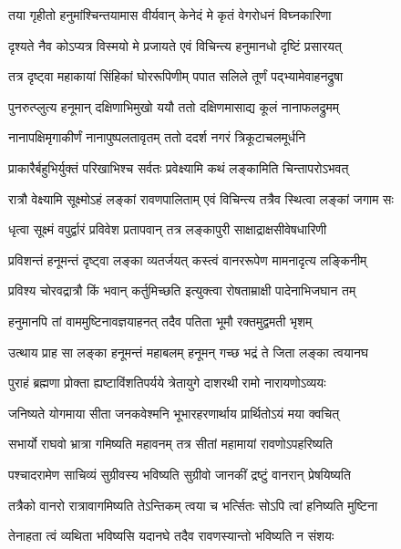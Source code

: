 \twolineshloka
{तया गृहीतो हनुमांश्चिन्तयामास वीर्यवान्}
{केनेदं मे कृतं वेगरोधनं विघ्नकारिणा} %

\twolineshloka
{दृश्यते नैव कोऽप्यत्र विस्मयो मे प्रजायते}
{एवं विचिन्त्य हनुमानधो दृष्टिं प्रसारयत्} %

\twolineshloka
{तत्र दृष्ट्वा महाकायां सिंहिकां घोररूपिणीम्}
{पपात सलिले तूर्णं पद्भ्यामेवाहनद्रुषा} %

\twolineshloka
{पुनरुत्प्लुत्य हनूमान् दक्षिणाभिमुखो ययौ}
{ततो दक्षिणमासाद्य कूलं नानाफलद्रुमम्} %

\twolineshloka
{नानापक्षिमृगाकीर्णं नानापुष्पलतावृतम्}
{ततो ददर्श नगरं त्रिकूटाचलमूर्धनि} %

\twolineshloka
{प्राकारैर्बहुभिर्युक्तं परिखाभिश्च सर्वतः}
{प्रवेक्ष्यामि कथं लङ्कामिति चिन्तापरोऽभवत्} %

\twolineshloka
{रात्रौ वेक्ष्यामि सूक्ष्मोऽहं लङ्कां रावणपालिताम्}
{एवं विचिन्त्य तत्रैव स्थित्वा लङ्कां जगाम सः} %

\twolineshloka
{धृत्वा सूक्ष्मं वपुर्द्वारं प्रविवेश प्रतापवान्}
{तत्र लङ्कापुरी साक्षाद्राक्षसीवेषधारिणी} %

\twolineshloka
{प्रविशन्तं हनूमन्तं दृष्ट्वा लङ्का व्यतर्जयत्}
{कस्त्वं वानररूपेण मामनादृत्य लङ्किनीम्} %

\twolineshloka
{प्रविश्य चोरवद्रात्रौ किं भवान् कर्तुमिच्छति}
{इत्युक्त्वा रोषताम्राक्षी पादेनाभिजघान तम्} %

\twolineshloka
{हनुमानपि तां वाममुष्टिनावज्ञयाहनत्}
{तदैव पतिता भूमौ रक्तमुद्वमती भृशम्} %

\twolineshloka
{उत्थाय प्राह सा लङ्का हनूमन्तं महाबलम्}
{हनूमन् गच्छ भद्रं ते जिता लङ्का त्वयानघ} %

\twolineshloka
{पुराहं ब्रह्मणा प्रोक्ता ह्यष्टाविंशतिपर्यये}
{त्रेतायुगे दाशरथी रामो नारायणोऽव्ययः} %

\twolineshloka
{जनिष्यते योगमाया सीता जनकवेश्मनि}
{भूभारहरणार्थाय प्रार्थितोऽयं मया क्वचित्} %

\twolineshloka
{सभार्यो राघवो भ्रात्रा गमिष्यति महावनम्}
{तत्र सीतां महामायां रावणोऽपहरिष्यति} %

\twolineshloka
{पश्चादरामेण साचिव्यं सुग्रीवस्य भविष्यति}
{सुग्रीवो जानकीं द्रष्टुं वानरान् प्रेषयिष्यति} %

\twolineshloka
{तत्रैको वानरो रात्रावागमिष्यति तेऽन्तिकम्}
{त्वया च भर्त्सितः सोऽपि त्वां हनिष्यति मुष्टिना} %

\twolineshloka
{तेनाहता त्वं व्यथिता भविष्यसि यदानघे}
{तदैव रावणस्यान्तो भविष्यति न संशयः} %

